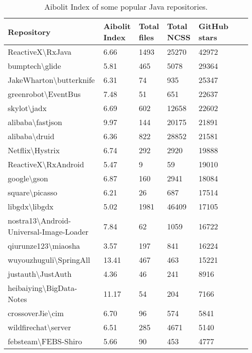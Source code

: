 \begin{table}[t]
\footnotesize
    \begin{tabular}{|l|l|l|l|l|l|l|}
    \hline
    Repository & Aibolit Index & Total files & Total NCSS & GitHub stars \\
    \hline
    ReactiveX\textbackslash RxJava& 6.66& 1493& 25270 & 42972  \\
    bumptech\textbackslash glide& 5.81& 465& 5078 & 29364 \\
    JakeWharton\textbackslash butterknife& 6.31& 74& 935 & 25347  \\
    greenrobot\textbackslash EventBus& 7.48& 51& 651 & 22637  \\
    skylot\textbackslash jadx& 6.69& 602& 12658 & 22602 \\
    alibaba\textbackslash fastjson & 9.97& 144& 20175 & 21891 \\
    alibaba\textbackslash druid & 6.36& 822& 28852 & 21581 \\
    Netflix\textbackslash Hystrix& 6.74& 292& 2920 & 19888 \\
    ReactiveX\textbackslash RxAndroid& 5.47& 9& 59 & 19010 \\
    google\textbackslash gson& 6.87& 160& 2941 & 18084 \\
    square\textbackslash picasso& 6.21& 26& 687 & 17514 \\
    libgdx\textbackslash libgdx & 5.02 & 1981 & 46409 & 17105 \\
    nostra13\textbackslash Android-Universal-Image-Loader& 7.84& 62& 1059 & 16722  \\
    qiurunze123\textbackslash miaosha& 3.57& 197& 841 & 16224 \\
    wuyouzhuguli\textbackslash SpringAll& 13.41& 467& 463 & 15221 \\
    justauth\textbackslash JustAuth& 4.36& 46& 241 & 8916 \\
    heibaiying\textbackslash BigData-Notes& 11.17& 54& 204 & 7166  \\
    crossoverJie\textbackslash cim & 6.70& 96& 574 & 5841 \\
    wildfirechat\textbackslash server& 6.51& 285& 4671  & 5140 \\
    febsteam\textbackslash FEBS-Shiro & 5.66& 90& 453 & 4777 \\
    \hline
    \end{tabular}
    \centering
\caption{Aibolit Index of some popular Java repositories. \label{table:aibolit_index_repos}}
\end{table}
